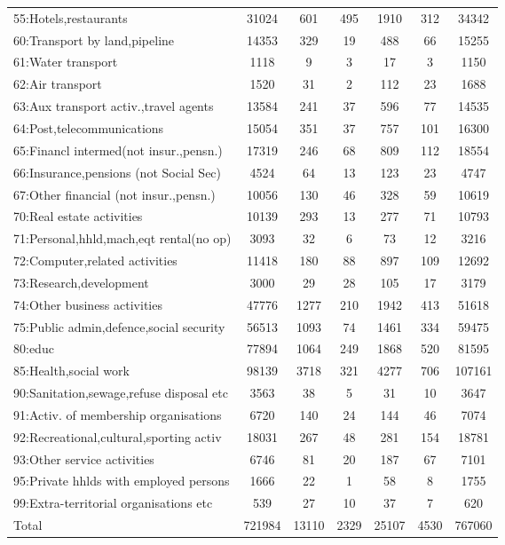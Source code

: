 {\begin{longtable}{l*{6}{c}}
55:Hotels,restaurants&    31024&      601&      495&     1910&      312&    34342\\
60:Transport by land,pipeline&    14353&      329&       19&      488&       66&    15255\\
61:Water transport&     1118&        9&        3&       17&        3&     1150\\
62:Air transport&     1520&       31&        2&      112&       23&     1688\\
63:Aux transport activ.,travel agents&    13584&      241&       37&      596&       77&    14535\\
64:Post,telecommunications&    15054&      351&       37&      757&      101&    16300\\
65:Financl intermed(not insur.,pensn.)&    17319&      246&       68&      809&      112&    18554\\
66:Insurance,pensions (not Social Sec)&     4524&       64&       13&      123&       23&     4747\\
67:Other financial (not insur.,pensn.)&    10056&      130&       46&      328&       59&    10619\\
70:Real estate activities&    10139&      293&       13&      277&       71&    10793\\
71:Personal,hhld,mach,eqt rental(no op)&     3093&       32&        6&       73&       12&     3216\\
72:Computer,related activities&    11418&      180&       88&      897&      109&    12692\\
73:Research,development&     3000&       29&       28&      105&       17&     3179\\
74:Other business activities&    47776&     1277&      210&     1942&      413&    51618\\
75:Public admin,defence,social security&    56513&     1093&       74&     1461&      334&    59475\\
80:educ   &    77894&     1064&      249&     1868&      520&    81595\\
85:Health,social work&    98139&     3718&      321&     4277&      706&   107161\\
90:Sanitation,sewage,refuse disposal etc&     3563&       38&        5&       31&       10&     3647\\
91:Activ. of membership organisations&     6720&      140&       24&      144&       46&     7074\\
92:Recreational,cultural,sporting activ&    18031&      267&       48&      281&      154&    18781\\
93:Other service activities&     6746&       81&       20&      187&       67&     7101\\
95:Private hhlds with employed persons&     1666&       22&        1&       58&        8&     1755\\
99:Extra-territorial organisations etc&      539&       27&       10&       37&        7&      620\\
Total     &   721984&    13110&     2329&    25107&     4530&   767060\\
\hline\hline
\end{longtable}
}
